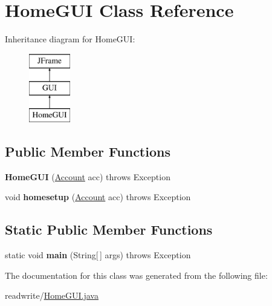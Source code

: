 \hypertarget{class_home_g_u_i}{}\section{Home\+G\+UI Class Reference}
\label{class_home_g_u_i}
Inheritance diagram for Home\+G\+UI\+:\begin{figure}[H]
\begin{center}
\leavevmode
\includegraphics[height=3.000000cm]{class_home_g_u_i}
\end{center}
\end{figure}
\subsection*{Public Member Functions}
\begin{DoxyCompactItemize}
\item 
\mbox{\label{class_home_g_u_i_ad0d85d5fd78eab3c47e757d4c7b9859d}} 
{\bfseries Home\+G\+UI} (\hyperlink{class_account}{Account} acc)  throws Exception 
\item 
\mbox{\label{class_home_g_u_i_ae36a24898b4b5eefde0f368b34c034ba}} 
void {\bfseries homesetup} (\hyperlink{class_account}{Account} acc)  throws Exception
\end{DoxyCompactItemize}
\subsection*{Static Public Member Functions}
\begin{DoxyCompactItemize}
\item 
\mbox{\label{class_home_g_u_i_a103b19a63dc812afce33988dd2cce460}} 
static void {\bfseries main} (String\mbox{[}$\,$\mbox{]} args)  throws Exception 
\end{DoxyCompactItemize}


The documentation for this class was generated from the following file\+:\begin{DoxyCompactItemize}
\item 
readwrite/\hyperlink{_home_g_u_i_8java}{Home\+G\+U\+I.\+java}\end{DoxyCompactItemize}
